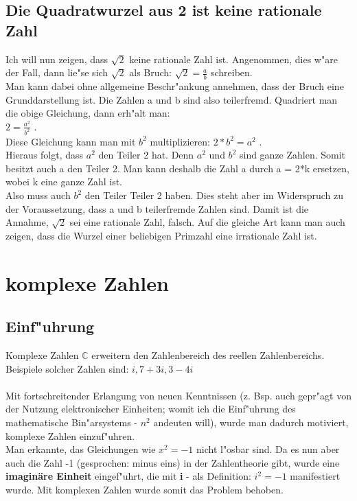 \subsection{Die Quadratwurzel aus 2 ist keine rationale Zahl}
Ich will nun zeigen, dass $\sqrt{2}$ keine rationale Zahl ist. Angenommen, dies w"are der Fall,
dann lie"se sich $\sqrt{2}$ als Bruch: $\sqrt{2} = \frac{a}{b}$ schreiben.\\
Man kann dabei ohne allgemeine Beschr"ankung annehmen, dass der Bruch eine Grunddarstellung ist.
Die Zahlen a und b sind also teilerfremd. Quadriert man die obige Gleichung, dann erh"alt man:\\
$2 = \frac{a^2}{b^2}$ .\\
Diese Gleichung kann man mit $b^2$ multiplizieren: $2 * b^2 = a^2$ . \\
Hieraus folgt, dass $a^2$ den Teiler 2 hat. Denn $a^2$ und $b^2$ sind ganze Zahlen.
Somit besitzt auch a den Teiler 2. Man kann deshalb die Zahl a durch a = 2*k ersetzen, wobei k
eine ganze Zahl ist.\\
Also muss auch $b^2$ den Teiler Teiler 2 haben. Dies steht aber im Widerspruch zu der
Voraussetzung, dass a und b teilerfremde Zahlen sind. Damit ist die Annahme, $\sqrt{2}$
sei eine rationale Zahl, falsch. Auf die gleiche Art kann man auch zeigen, dass die Wurzel
einer beliebigen Primzahl eine irrationale Zahl ist.

\section{komplexe Zahlen}
\subsection{Einf"uhrung}
Komplexe Zahlen $\mathbb{C}$ erweitern den Zahlenbereich des reellen Zahlenbereichs.\\
Beispiele solcher Zahlen sind: $i, 7 + 3i, 3 - 4i$\\
\\
Mit fortschreitender Erlangung von neuen Kenntnissen (z. Bsp. auch gepr"agt
von der Nutzung elektronischer Einheiten; womit ich
die Einf"uhrung des mathematische Bin"arsystems - $n^2$ andeuten will), wurde man
dadurch motiviert, komplexe Zahlen einzuf"uhren.\\
Man erkannte, das Gleichungen wie $x^2 = -1$ nicht l"osbar sind.
Da es nun aber auch die Zahl -1 (gesprochen: minus eins) in der
Zahlentheorie gibt, wurde eine \textbf{imaginäre Einheit} eingef"uhrt, die mit \textbf{i}
- als Definition: \textbf{ $ i^2 = -1 $ }  manifestiert wurde.
Mit komplexen Zahlen wurde somit das Problem behoben.

